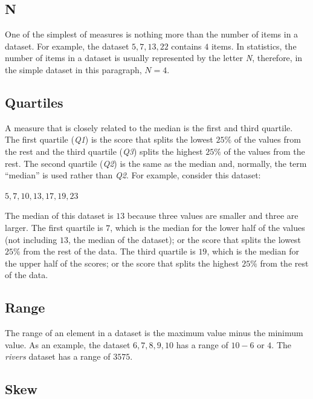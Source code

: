 \subsection{N}\label{lab03_n}

One of the simplest of measures is nothing more than the number of items in a dataset. For example, the dataset $ 5, 7, 13, 22 $ contains $ 4 $ items. In statistics, the number of items in a dataset is usually represented by the letter \textit{N}, therefore, in the simple dataset in this paragraph, $ N = 4 $. 

\subsection{Quartiles}\label{lab03_quartiles}

A measure that is closely related to the median is the first and third quartile. The first quartile (\textit{Q1}) is the score that splits the lowest $ 25\% $ of the values from the rest and the third quartile (\textit{Q3}) splits the highest $ 25\% $ of the values from the rest. The second quartile (\textit{Q2}) is the same as the median and, normally, the term ``median'' is used rather than \textit{Q2}. For example, consider this dataset: 

\begin{center}
  $ 5, 7, 10, 13, 17, 19, 23 $
\end{center}

The median of this dataset is $ 13 $ because three values are smaller and three are larger. The first quartile is $ 7 $, which is the median for the lower half of the values (not including $ 13 $, the median of the dataset); or the score that splits the lowest $ 25 \% $ from the rest of the data. The third quartile is $ 19 $, which is the median for the upper half of the scores; or the score that splits the highest $ 25 \% $ from the rest of the data. 


\subsection{Range}\label{lab03_range}

The range of an element in a dataset is the maximum value minus the minimum value. As an example, the dataset $ 6, 7, 8, 9, 10 $ has a range of $ 10-6 $ or $ 4 $. The \textit{rivers} dataset has a range of $ 3575 $.

\subsection{Skew}\label{lab03_skew}

